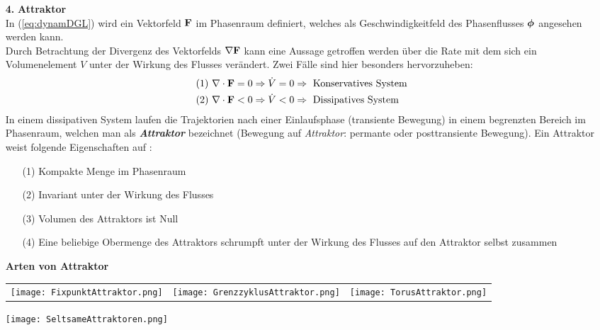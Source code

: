 \begin{itemize}
    \item[\textbf{4.}]\textbf{Attraktor}\\
    In (\ref{eq:dynamDGL}) wird ein Vektorfeld $\boldsymbol{\mathbf{F}}$ im Phasenraum definiert, welches als Geschwindigkeitfeld des Phasenflusses $\boldsymbol{\mathbf{\phi}}$ angesehen werden kann.\\ Durch Betrachtung der Divergenz des Vektorfelds $\nabla\boldsymbol{\mathbf{F}}$ kann eine Aussage getroffen werden über die Rate mit dem sich ein Volumenelement $V$ unter der Wirkung des Flusses verändert. Zwei Fälle sind hier besonders hervorzuheben:
    \begin{gather}
        \begin{aligned}
            (1)~&\nabla\cdot\boldsymbol{\mathbf{F}}=0\Rightarrow \dot{V}=0 \Rightarrow~\text{Konservatives System}\\
            (2)~&\nabla\cdot\boldsymbol{\mathbf{F}}<0\Rightarrow \dot{V}<0 \Rightarrow~\text{Dissipatives System}
        \end{aligned}
    \end{gather}
    In einem dissipativen System laufen die Trajektorien nach einer Einlaufsphase (transiente Bewegung) in einem begrenzten Bereich im Phasenraum, welchen man als \textit{\textbf{Attraktor}} bezeichnet (Bewegung auf \textit{Attraktor}: permante oder posttransiente Bewegung). Ein Attraktor weist folgende Eigenschaften auf \citep{Lueck}:
    \begin{itemize}
        \item[(1)] Kompakte Menge im Phasenraum
        \item[(2)] Invariant unter der Wirkung des Flusses
        \item[(3)] Volumen des Attraktors ist Null
        \item[(4)] Eine beliebige Obermenge des Attraktors schrumpft unter der Wirkung des Flusses auf den Attraktor selbst zusammen   
    \end{itemize}
    \textbf{Arten von Attraktor}
    \begin{center}
        \begin{tabular}{ccc}
            \texttt{[image: FixpunktAttraktor.png]}
            & \texttt{[image: GrenzzyklusAttraktor.png]}
            & \texttt{[image: TorusAttraktor.png]}
        \end{tabular}
        \texttt{[image: SeltsameAttraktoren.png]}
    \end{center}
\end{itemize}

